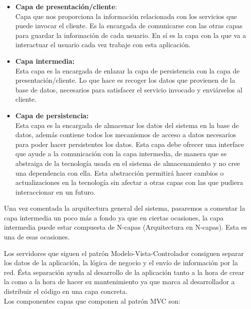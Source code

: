 \begin{itemize}
\item \textbf{Capa de presentación/cliente}:\\
Capa que nos proporciona la información relacionada con los servicios que puede invocar el cliente. Es la encargada de comunicarse con las otras capas para guardar la información de cada usuario. En sí es la capa con la que va a interactuar el usuario cada vez trabaje con esta aplicación.

\item \textbf{Capa intermedia:}\\
Esta capa es la encargada de enlazar la capa de persistencia con la capa de presentación/cliente. Lo que hace es recoger los datos que provienen de la base de datos, necesarios para satisfacer el servicio invocado y enviárselos al cliente.

\item \textbf{Capa de persistencia:}\\
Esta capa es la encargada de almacenar los datos del sistema en la base de datos, además contiene todos los mecanismos de acceso a datos necesarios para poder hacer persistentes los datos.
 Esta capa debe ofrecer una interface que ayude a la comunicación con la capa intermedia, de manera que se abstraiga de la tecnología usada en el sistema de almacenamiento y no cree una dependencia con ella. Esta abstracción permitirá hacer cambios o actualizaciones en la tecnología sin afectar a otras capas con las que pudiera interaccionar en un futuro.\\
\end{itemize}
Una vez comentada la arquitectura general del sistema, pasaremos a comentar la capa intermedia un poco más a fondo ya que en ciertas ocasiones, la capa intermedia puede estar compuesta de N-capas (Arquitectura en N-capas). Esta es una de esas ocasiones.

Los servidores que siguen el patrón Modelo-Vista-Controlador consiguen separar los datos de la  aplicación, la lógica de negocio  y el envío  de información por la red.
Ésta separación ayuda al desarrollo de la aplicación tanto a la hora de crear la como a la hora de hacer su mantenimiento ya que marca al desarrollador a distribuir el código en una capa concreta. \\


Los componentes capas que componen al patrón MVC son:

